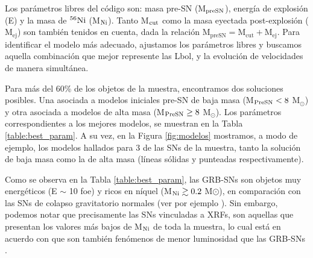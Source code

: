 \documentclass[baaa]{baaa}
\newcommand{\manu}[1]{\textcolor{red}{#1}}
\begin{document}
Los parámetros libres del código son: masa pre-SN (M$_{\rm{preSN}}$), energía de explosión (E) y la masa de $^{56}\rm{Ni}$ (M$_{\rm{Ni}}$). Tanto M$_{\rm{cut}}$ como la masa eyectada post-explosión ($\mathrm{M_{ej}}$) son también tenidos en cuenta, dada la relación $\mathrm{M_{preSN}= M_{cut}+M_{ej}}$. Para identificar el modelo más adecuado, ajustamos los parámetros libres y buscamos aquella combinación que mejor represente las Lbol, %
y la evoluci\'on de velocidades de manera simultánea.


Para más del 60\% de los objetos de la muestra, encontramos dos soluciones posibles. Una asociada a modelos iniciales pre-SN de baja masa (M${_{\rm{PreSN}}} < 8$ M$_\odot$) y otra asociada a modelos de alta masa (M${_{\rm{PreSN}}} \geq 8$ M$_\odot$). Los parámetros correspondientes a los mejores modelos, se muestran en la Tabla \ref{table:best_param}. A su vez, en la Figura \ref{fig:modelos} mostramos, a modo de ejemplo, los modelos hallados para 3 de las SNs de la muestra, tanto la solución de baja masa como la de alta masa (l\'ineas sólidas y punteadas respectivamente).


Como se observa en la Tabla \ref{table:best_param}, las GRB-SNs son objetos muy energéticos (E $\sim$ 10 foe) y ricos en n\'iquel (M$_{\rm{Ni}} \gtrsim 0.2$ M$\odot$), en comparación con las SNs de colapso gravitatorio normales (ver por ejemplo \cite{Taddia:2018}). Sin embargo, podemos notar que precisamente las SNs vinculadas a XRFs, son aquellas que presentan los valores más bajos de M$_{\rm{Ni}}$ de toda la muestra, lo cual está en acuerdo con que son también fenómenos de menor luminosidad que las GRB-SNs \citep{Heise:2001}.%
\end{document}
